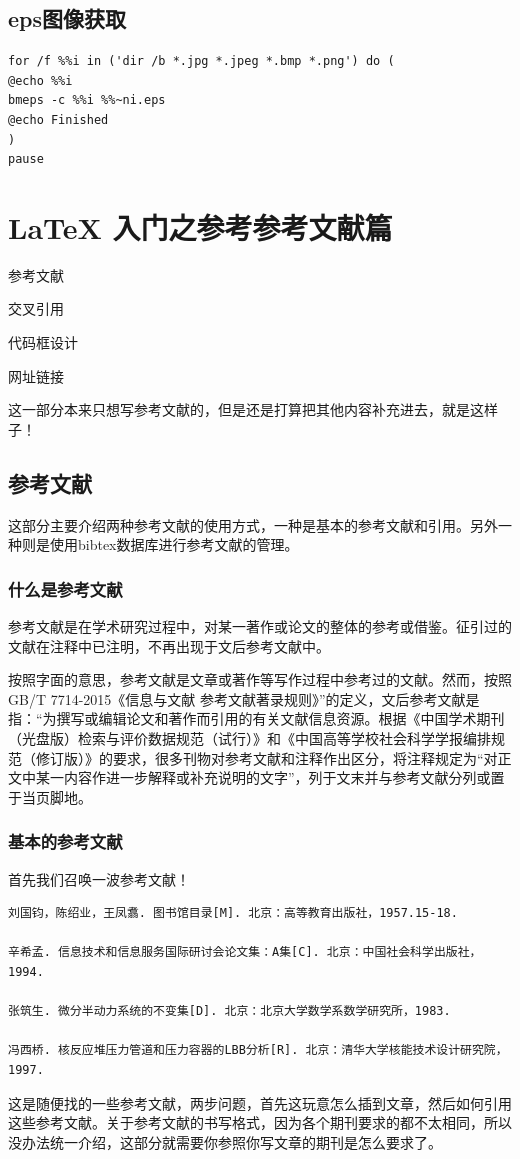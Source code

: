 \documentclass[cn,chinese,color=cyan]{elegantbook}
\begin{document}
\section{eps图像获取}
\begin{lstlisting}[style=R] 
for /f %%i in ('dir /b *.jpg *.jpeg *.bmp *.png') do (
@echo %%i
bmeps -c %%i %%~ni.eps
@echo Finished
)
pause
\end{lstlisting}
\chapter{LaTeX 入门之参考参考文献篇}
\begin{introduction}
	\item 参考文献
	\item 交叉引用
	\item 代码框设计
	\item 网址链接
\end{introduction}
这一部分本来只想写参考文献的，但是还是打算把其他内容补充进去，就是这样子！
\section{参考文献}
这部分主要介绍两种参考文献的使用方式，一种是基本的参考文献和引用。另外一种则是使用bibtex数据库进行参考文献的管理。


\subsection{什么是参考文献}
参考文献是在学术研究过程中，对某一著作或论文的整体的参考或借鉴。征引过的文献在注释中已注明，不再出现于文后参考文献中。

按照字面的意思，参考文献是文章或著作等写作过程中参考过的文献。然而，按照GB/T 7714-2015《信息与文献 参考文献著录规则》”的定义，文后参考文献是指：“为撰写或编辑论文和著作而引用的有关文献信息资源。根据《中国学术期刊（光盘版）检索与评价数据规范（试行）》和《中国高等学校社会科学学报编排规范（修订版）》的要求，很多刊物对参考文献和注释作出区分，将注释规定为“对正文中某一内容作进一步解释或补充说明的文字”，列于文末并与参考文献分列或置于当页脚地。


\subsection{基本的参考文献}
首先我们召唤一波参考文献！
\begin{lstlisting}[style=R]
刘国钧，陈绍业，王凤翥. 图书馆目录[M]. 北京：高等教育出版社，1957.15-18.

辛希孟. 信息技术和信息服务国际研讨会论文集：A集[C]. 北京：中国社会科学出版社，1994.

张筑生. 微分半动力系统的不变集[D]. 北京：北京大学数学系数学研究所，1983.

冯西桥. 核反应堆压力管道和压力容器的LBB分析[R]. 北京：清华大学核能技术设计研究院，1997.
\end{lstlisting}
这是随便找的一些参考文献，两步问题，首先这玩意怎么插到文章，然后如何引用这些参考文献。关于参考文献的书写格式，因为各个期刊要求的都不太相同，所以没办法统一介绍，这部分就需要你参照你写文章的期刊是怎么要求了。
\end{document}
